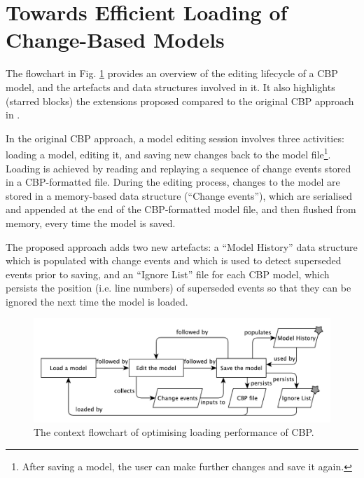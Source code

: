 \documentclass{llncs}
\begin{document}

\section{Towards Efficient Loading of Change-Based Models}
\label{sec:loading_time_optimisation}
The flowchart in Fig. \ref{fig:flowchart} provides an overview of the editing lifecycle of a CBP model, and the artefacts and data structures involved in it. It also highlights (starred blocks) the extensions proposed compared to the original CBP approach in \cite{yohannis2017turning}.

In the original CBP approach, a model editing session involves three activities: loading a model, editing it, and saving new changes back to the model file\footnote{After saving a model, the user can make further changes and save it again.}. Loading is achieved by reading and replaying a sequence of change events stored in a CBP-formatted file. During the editing process, changes to the model are stored in a memory-based data structure (``Change events''), which are serialised and appended at the end of the CBP-formatted model file, and then flushed from memory, every time the model is saved.

The proposed approach adds two new artefacts: a ``Model History'' data structure which is populated with change events and which is used to detect superseded events prior to saving, and an ``Ignore List'' file for each CBP model, which persists the position (i.e. line numbers) of superseded events so that they can be ignored the next time the model is loaded.


\begin{figure}[ht]
\centering
\includegraphics[width=\linewidth]{flowchart}
\caption{The context flowchart of optimising loading performance of CBP.}
\label{fig:flowchart}
\end{figure}
\end{document}
